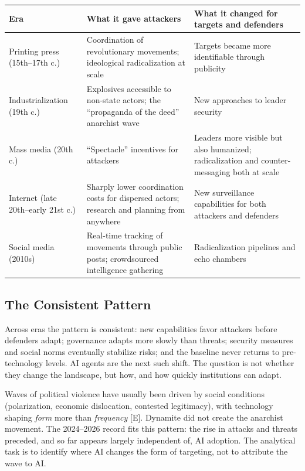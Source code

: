 \documentclass[11pt,letterpaper]{article}
\begin{document}
\begin{center}
\small
\begin{tabular}{L{3.3cm}L{5.6cm}L{6.2cm}}
\toprule
\textbf{Era} & \textbf{What it gave attackers} & \textbf{What it changed for targets and defenders} \\
\midrule
Printing press (15th--17th c.) & Coordination of revolutionary movements; ideological radicalization at scale & Targets became more identifiable through publicity \\
Industrialization (19th c.) & Explosives accessible to non-state actors; the ``propaganda of the deed'' anarchist wave & New approaches to leader security \\
Mass media (20th c.) & ``Spectacle'' incentives for attackers & Leaders more visible but also humanized; radicalization and counter-messaging both at scale \\
Internet (late 20th--early 21st c.) & Sharply lower coordination costs for dispersed actors; research and planning from anywhere & New surveillance capabilities for both attackers and defenders \\
Social media (2010s) & Real-time tracking of movements through public posts; crowdsourced intelligence gathering & Radicalization pipelines and echo chambers \\
\bottomrule
\end{tabular}
\end{center}

\subsection{The Consistent Pattern}

Across eras the pattern is consistent: new capabilities favor attackers before defenders adapt; governance adapts more slowly than threats; security measures and social norms eventually stabilize risks; and the baseline never returns to pre-technology levels. AI agents are the next such shift. The question is not whether they change the landscape, but how, and how quickly institutions can adapt.

\begin{infobox}
Waves of political violence have usually been driven by social conditions (polarization, economic dislocation, contested legitimacy), with technology shaping \textit{form} more than \textit{frequency} [E]. Dynamite did not create the anarchist movement. The 2024--2026 record fits this pattern: the rise in attacks and threats preceded, and so far appears largely independent of, AI adoption. The analytical task is to identify where AI changes the form of targeting, not to attribute the wave to AI.
\end{infobox}
\end{document}
